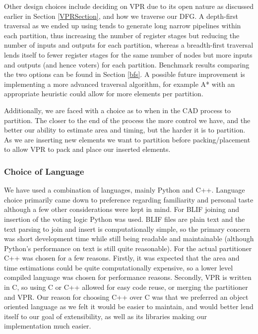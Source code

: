 \documentclass[12pt,final,oneside]{dwThesis} %
\begin{document}
   Other design choices include deciding on \gls{VPR} due to its open nature as
   discussed earlier in Section \ref{VPRSection}, and how we traverse our
   \gls{DFG}. A depth-first traversal as we ended up using tends to generate
   long narrow pipelines within each partition, thus increasing the number of
   register stages but reducing the number of inputs and outputs for each
   partition, whereas a breadth-first traversal lends itself to fewer register
   stages for the same number of nodes but more inputs and outputs (and hence
   voters) for each partition. Benchmark results
   comparing the two options can be found in Section \ref{bfs}.
    A possible future improvement is implementing a
   more advanced traversal algorithm, for example A* with an appropriate
   heuristic could allow for more elements per partition.

   Additionally, we are faced with a choice as to when in the \gls{CAD} process
   to partition. The closer to the end of the process the more control we have,
   and the better our ability to estimate area and timing, but the harder it is
   to partition. As we are inserting new elements we want to partition before
   packing/placement to allow \gls{VPR} to pack and place our inserted
   elements.

   \subsubsection{Choice of Language} We have used a combination of languages,
   mainly Python and C++. Language choice primarily came down to preference
   regarding familiarity and personal taste although a few other considerations
   were kept in mind.  For \gls{BLIF} joining and insertion of the voting logic
   Python was used. \gls{BLIF} files are plain text and the text parsing to
   join and insert is computationally simple, so the primary concern was short
   development time while still being readable and maintainable (although
   Python's performance on text is still quite
   reasonable)\cite{LanguageBenchmark}.  For the actual partitioner C++ was
   chosen for a few reasons. Firstly, it was expected that the area and time
   estimations could be quite computationally expensive, so a lower level
   compiled language was chosen for performance
   reasons\cite{LanguageBenchmark}. Secondly, \gls{VPR} is written in C, so
   using C or C++ allowed for easy code reuse, or merging the partitioner and
   \gls{VPR}. Our reason for choosing C++ over C was that we preferred an
   object oriented language as we felt it would be easier to maintain, and
   would better lend itself to our goal of extensibility, as well as its
   libraries making our implementation much easier.
\end{document}
